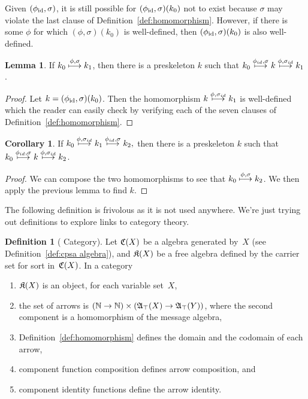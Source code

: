 \documentclass[12pt]{article}
\theoremstyle{definition}
\newtheorem{defn}{Definition}[section]
\newtheorem{lem}[thm]{Lemma}
\newtheorem{cor}{Corollary}
\newenvironment{note}{\itshape\par\noindent}{}
\begin{document}
Given $(\phi_{\mathrm{id}},\sigma)$, it is still possible for $(\phi_{\mathrm{id}},\sigma)(k_0)$ not
to exist because $\sigma$ may violate the last clause of
Definition~\ref{def:homomorphism}.  However, if there is some $\phi$
for which $(\phi,\sigma)(k_0)$ is well-defined, then $(\phi_{\mathrm{id}},\sigma)(k_0)$
is also well-defined.

\begin{lem}\label{lem:decompose}
If $k_0\stackrel{\phi,\sigma}{\longmapsto}k_1$, then there is a preskeleton $k$ such
that $k_0\stackrel{\phi_{id},\sigma}{\longmapsto}k\stackrel{\phi,\sigma_{id}}{\longmapsto}k_1$.
\end{lem}

\begin{proof}
Let $k=(\phi_{\mathrm{id}},\sigma)(k_0)$.  Then the
homomorphism $k\stackrel{\phi,\sigma_{id}}{\longmapsto}k_1$ is well-defined which the
reader can easily check by verifying each of the seven clauses of
Definition~\ref{def:homomorphism}.
\end{proof}

\begin{cor}\label{cor:commute}
If $k_0\stackrel{\phi,\sigma_{id}}{\longmapsto}k_1\stackrel{\phi_{id},\sigma}{\longmapsto}k_2,$
then there is a preskeleton $k$ such that
$k_0\stackrel{\phi_{id},\sigma}{\longmapsto}k\stackrel{\phi,\sigma_{id}}{\longmapsto}k_2$.
\end{cor}

\begin{proof}
We can compose the two homomorphisms to see that
$k_0\stackrel{\phi,\sigma}{\longmapsto}k_2$.  We then apply the previous lemma to find $k$.
\end{proof}

\begin{note}
The following definition is frivolous as it is not used anywhere.
We're just trying out definitions to explore links to category theory.
\end{note}

\begin{defn}[{\cpsa} Category]\label{def:cpsa category}
Let $\mathfrak C(X)$ be a {\cpsa} algebra
generated by~$X$ (see Definition~\ref{def:cpsa algebra}), and
$\mathfrak K(X)$ be  a free
algebra defined by the carrier set for sort 
in~$\mathfrak C(X)$.  In a {\cpsa} category
\begin{enumerate}
\item $\mathfrak K(X)$ is an object, for each variable set~$X$,
\item the set of arrows is $(\mathbb{N}\to\mathbb{N})\times
(\mathfrak A_\top(X)\to\mathfrak A_\top(Y))$, where the second component is a
  homomorphism of the message algebra,
\item Definition~\ref{def:homomorphism} defines the domain and the
  codomain of each arrow,
\item component function composition defines arrow composition, and
\item component identity functions define the arrow identity.
\end{enumerate}
\end{defn}
\end{document}
